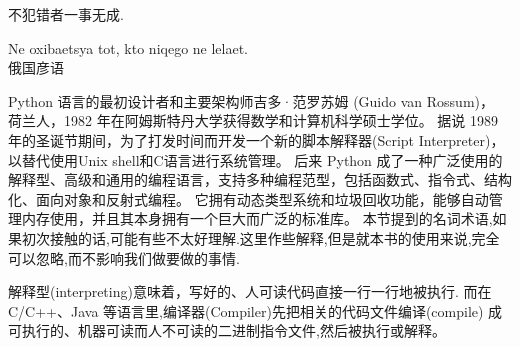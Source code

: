 \documentclass[main.tex]{subfiles}
\begin{document}
\begin{flushright}
	\begin{kaishu}
		不犯错者一事无成.\\
	\end{kaishu}
{\selectfont Ne oxibaet{}s{ya} tot, kto niqego ne lelaet.}\\
俄国彦语
\end{flushright}

Python 语言的最初设计者和主要架构师吉多·范罗苏姆 (Guido van Rossum)， 荷兰人，1982 年在阿姆斯特丹大学获得数学和计算机科学硕士学位。
据说 1989 年的圣诞节期间，为了打发时间而开发一个新的脚本解释器(Script Interpreter)，以替代使用Unix shell和C语言进行系统管理。
后来 Python 成了一种广泛使用的解释型、高级和通用的编程语言，支持多种编程范型，包括函数式、指令式、结构化、面向对象和反射式编程。
它拥有动态类型系统和垃圾回收功能，能够自动管理内存使用，并且其本身拥有一个巨大而广泛的标准库。
本节提到的名词术语,如果初次接触的话,可能有些不太好理解.这里作些解释,但是就本书的使用来说,完全可以忽略,而不影响我们做要做的事情.

解释型(interpreting)意味着，写好的、人可读代码直接一行一行地被执行. 而在 C/C++、Java 等语言里,编译器(Compiler)先把相关的代码文件编译(compile)
成可执行的、机器可读而人不可读的二进制指令文件,然后被执行或解释。
\end{document}
